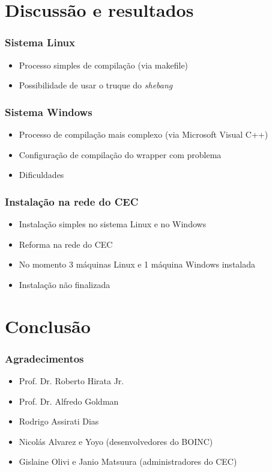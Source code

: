 \documentclass{beamer}
\begin{document}
\section{Discussão e resultados} 

\begin{frame}
  \frametitle{Sistema Linux}
  \begin{itemize}
    \item Processo simples de compilação (via makefile)
    \item Possibilidade de usar o truque do \textit{shebang}
  \end{itemize}
\end{frame}

\begin{frame}
  \frametitle{Sistema Windows}
  \begin{itemize}
    \item Processo de compilação mais complexo (via Microsoft Visual C++)
    \item Configuração de compilação do wrapper com problema
    \item Dificuldades
  \end{itemize}
\end{frame}

\begin{frame}
  \frametitle{Instalação na rede do CEC}
  \begin{itemize}
    \item Instalação simples no sistema Linux e no Windows
    \item Reforma na rede do CEC
    \item No momento 3 máquinas Linux e 1 máquina Windows instalada
    \item Instalação não finalizada
  \end{itemize}
\end{frame}

\section{Conclusão}

\begin{frame}
  \frametitle{Agradecimentos}
  \begin{itemize}
    \item Prof. Dr. Roberto Hirata Jr.
    \item Prof. Dr. Alfredo Goldman
    \item Rodrigo Assirati Dias
    \item Nicolás Alvarez e Yoyo (desenvolvedores do BOINC)
    \item Gislaine Olivi e Janio Matsuura (administradores do CEC)
  \end{itemize}
\end{frame}
\end{document}
